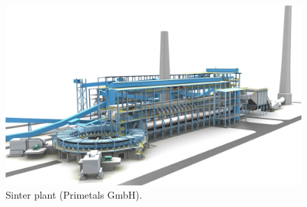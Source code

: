 \begin{figure}[!htb]
\centering
\includegraphics[width=.92\columnwidth]{images/124sinterplant}
\caption[Sinter plant]{Sinter plant (Primetals GmbH).}
\label{fig:124sinterplant}
\end{figure}